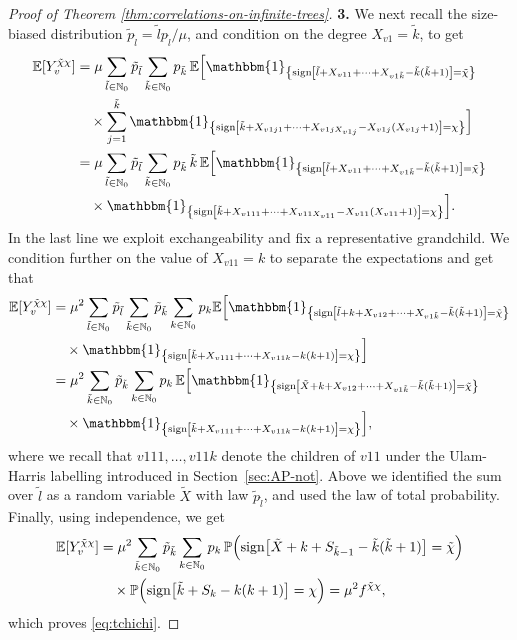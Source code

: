 \documentclass[11pt]{article}
\numberwithin{equation}{section}
\theoremstyle{plain}
\newcommand{\N}{\mathbb N}
\newcommand{\EE}{\mathbb E}
\newcommand{\PP}{\mathbb{P}}
\newcommand{\tX}{\tilde{X}}
\newcommand{\tk}{\tilde{k}}
\newcommand{\tl}{\tilde{l}}
\newcommand{\tp}{\tilde{p}}
\newcommand{\tchi}{{\tilde{\chi}}}
\newcommand{\ind}[1]{\mathbbm{1}_{\left\{#1\right\}}}
\begin{document}
\begin{proof}[Proof of Theorem \ref{thm:correlations-on-infinite-trees}]
\medskip\noindent
{\bf 3.}
We next recall the size-biased distribution $\tilde{p}_{\tl} = \tl p_{\tl} / \mu$, and condition on the degree $X_{v1}=\tk$, to get
\begin{align*}
\EE[Y_v^{\tchi\chi}]
&= \mu \sum_{\tl\in\N_0} \tilde{p}_{\tl} \sum_{\tk\in\N_0} p_{\tk}\,\EE\Big[\ind{{\rm sign}\left[\tl+X_{v11}
+\cdots+X_{v1\tk}-\tk(\tk+1)\right]=\tchi} \\
&\quad\times\sum_{j=1}^{\tk}\ind{{\rm sign}\left[\tk+X_{v1j1}+\cdots+X_{v1jX_{v1j}}-X_{v1j}(X_{v1j}+1)\right]=\chi}\Big]\\
&= \mu \sum_{\tl\in\N_0} \tilde{p}_{\tl} \sum_{\tk\in\N_0} p_{\tk}\,\tk\,
\EE\Big[\ind{{\rm sign}\left[\tl+X_{v11}+\cdots+X_{v1\tk}-\tk(\tk+1)\right]=\tchi} \\
&\quad\times\ind{{\rm sign}\left[\tk+X_{v111}+\cdots+X_{v11X_{v11}}-X_{v11}(X_{v11}+1)\right]=\chi}\Big].
\end{align*}
In the last line we exploit exchangeability and fix a representative grandchild. We condition further on the value of $X_{v11} = k$ to separate the expectations and get that
\begin{align*}
\EE[Y_v^{\tchi\chi}]
& =\mu^2 \sum_{\tl\in\N_0} \tilde{p}_{\tl} \sum_{\tk\in\N_0} \tilde{p}_{\tk} \sum_{k\in\N_0} p_k
\EE\Big[\ind{{\rm sign}\left[\tl+k+X_{v12}+\cdots+X_{v1\tk}-\tk(\tk+1)\right]=\tchi} \\
&\quad\times\ind{{\rm sign}\left[\tk+X_{v111}+\cdots+X_{v11k}-k(k+1)\right]=\chi}\Big]\\
&= \mu^2 \sum_{\tk\in\N_0} \tp_{\tk} \sum_{k\in\N_0} p_k\,
\EE\Big[\ind{{\rm sign}\left[\tX+k+X_{v12}+\cdots+X_{v1\tk}-\tk(\tk+1)\right]=\tchi} \\
&\quad\times\ind{{\rm sign}\left[\tk+X_{v111}+\cdots+X_{v11k}-k(k+1)\right]=\chi}\Big],
\end{align*}
where we recall that $v111,\ldots,v11k$ denote the children of $v11$ under the Ulam-Harris labelling introduced in Section~\ref{sec:AP-not}. Above we identified the sum over $\tl$ as a random variable $\tX$ with law $\tilde{p}_{\tl}$, and used the law of total probability. Finally, using independence, we get
\begin{align*}
\EE[Y_v^{\tchi\chi}]
&= \mu^2 \sum_{\tk\in\N_0} \tp_{\tk} \sum_{k\in\N_0} p_k\,\PP\Big({\rm sign}\big[\tX+k+S_{\tk-1}-\tk(\tk+1)\big]=\tchi\Big) \\
&\quad\times\PP\Big( {\rm sign}\big[\tk+S_k-k(k+1)\big]=\chi\Big)=\mu^2 f^{\tchi\chi},
\end{align*}
which proves \eqref{eq:tchichi}.


\end{proof}
\end{document}
